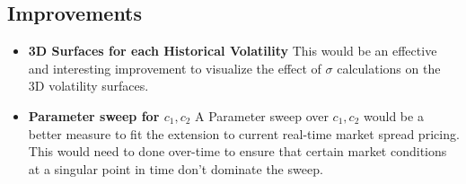 \documentclass{article}
\begin{document}
\subsection{Improvements}
\begin{flushleft} 
\begin{itemize}
  \item \textbf{3D Surfaces for each Historical Volatility} \newline
  \tabHorizontal This would be an effective and interesting improvement to visualize the effect of $\sigma$ calculations on the 3D volatility surfaces. 
  \item \textbf{Parameter sweep for $c_1,c_2$} \newline
  \tabHorizontal A Parameter sweep over $c_1, c_2$ would be a better measure to fit the extension to current real-time market spread pricing. This would need to done over-time to ensure that certain market conditions at a singular point in time don't dominate the sweep.  
\end{itemize}
\end{flushleft}
\end{document}
